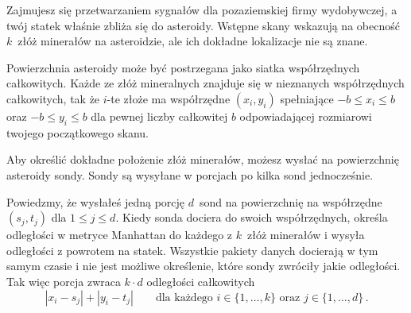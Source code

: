 

\noindent
Zajmujesz się przetwarzaniem sygnałów dla pozaziemskiej firmy wydobywczej, a twój statek właśnie zbliża się do asteroidy. 
Wstępne skany wskazują na obecność $k$~złóż minerałów na asteroidzie, ale ich dokładne lokalizacje nie są znane.

\medskip

Powierzchnia asteroidy może być postrzegana jako siatka współrzędnych całkowitych.
Każde ze złóż mineralnych znajduje się w nieznanych współrzędnych całkowitych, tak że $i$-te złoże ma współrzędne $(x_i, y_i)$ spełniające
$-b \le x_i \le b$ oraz $-b\le y_i \le b$ %
dla pewnej liczby całkowitej $b$ odpowiadającej rozmiarowi twojego początkowego skanu.

Aby określić dokładne położenie złóż minerałów, możesz wysłać na powierzchnię asteroidy sondy. 
Sondy są wysyłane w porcjach po kilka sond jednocześnie.

Powiedzmy, że wysłałeś jedną porcję $d$~sond na powierzchnię na współrzędne $(s_j,t_j)$ dla $1\leq j\leq d$.
Kiedy sonda dociera do swoich współrzędnych, określa odległości w metryce Manhattan do każdego z $k$~złóż minerałów i wysyła odległości z powrotem na statek. 
Wszystkie pakiety danych docierają w tym samym czasie i nie jest możliwe określenie, które sondy zwróciły jakie odległości. 
Tak więc porcja zwraca $k\cdot d$ odległości całkowitych
\[|x_i-s_j| + |y_i - t_j| \qquad\text{dla każdego } i \in \{1,\ldots,k\} \text{ oraz } j \in\{ 1,\ldots,d\}\,.\]

